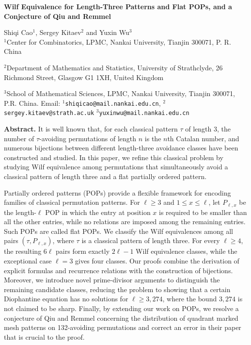 \documentclass[11pt]{article}
\begin{document}
\begin{center}
{\large \bf Wilf Equivalence for Length-Three Patterns and Flat POPs, and a Conjecture of Qiu and Remmel}
\end{center}
\begin{center}
Shiqi Cao$^{1}$, Sergey Kitaev$^{2}$ and Yuxin Wu$^{3}$\\[6pt]

$^{1}$Center for Combinatorics, LPMC, Nankai University, Tianjin 300071, P. R. China

$^{2}$Department of Mathematics and Statistics, University of Strathclyde, 26 Richmond Street, Glasgow G1 1XH, United Kingdom

$^{3}$School of Mathematical Sciences, LPMC, Nankai University, Tianjin 300071, P.R. China.
 Email: $^{1}${\tt shiqicao@mail.nankai.edu.cn},
       $^{2}${\tt sergey.kitaev@strath.ac.uk} 
       $^{3}${\tt yuxinwu@mail.nankai.edu.cn}
\end{center}
	


\noindent\textbf{Abstract.}
It is well known that, for each
classical pattern $\tau$ of length 3, the number of $\tau$-avoiding permutations
of length $n$ is the $n$th Catalan number, and numerous bijections between
different length-three avoidance classes have been constructed and studied.
In this paper, we refine this classical problem by studying Wilf equivalence
among permutations that simultaneously avoid a classical pattern of length
three and a flat partially ordered pattern.

Partially ordered patterns (POPs) provide a flexible framework for encoding
families of classical permutation patterns. For $\ell\geq 3$ and
$1\leq x\leq\ell$, let $P_{\ell,x}$ be the length-$\ell$ POP in which the
entry at position $x$ is required to be smaller than all the other entries,
while no relations are imposed among the remaining entries. Such POPs are
called flat POPs. We classify the Wilf equivalences among all pairs
$(\tau,P_{\ell,x})$, where $\tau$ is a classical pattern of length three.
For every $\ell\geq4$, the resulting $6\ell$ pairs form exactly $2\ell-1$
Wilf equivalence classes, while the exceptional case $\ell=3$ gives four
classes. Our proofs combine the derivation of explicit formulas and recurrence relations with the construction of bijections. Moreover, we introduce novel prime-divisor arguments to distinguish the
remaining candidate classes, reducing the problem to showing that a certain
Diophantine equation has no solutions for $\ell\ge 3{,}274$, where the
bound $3{,}274$ is not claimed to be sharp. Finally, by extending our work on POPs, we resolve a conjecture of Qiu and Remmel concerning the distribution of quadrant marked mesh patterns on 132-avoiding permutations and correct an error in their paper that is crucial to the proof. \\
	
\end{document}
